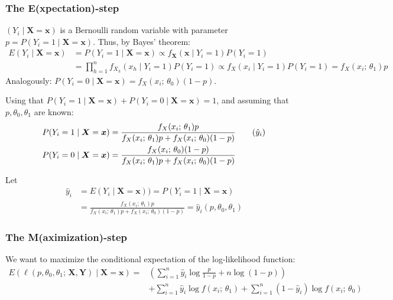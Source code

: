 \subsubsection{The E(xpectation)-step}
$(Y_i \mid \boldsymbol{X}=\boldsymbol{x})$ is a Bernoulli random variable with parameter
$p = P(Y_i = 1 \mid \boldsymbol{X}=\boldsymbol{x})$. Thus, by Bayes' theorem:
\begin{align*}
	E(Y_i \mid \boldsymbol{X}=\boldsymbol{x}) & = P(Y_i = 1 \mid \boldsymbol{X}=\boldsymbol{x})
	\propto f_{\boldsymbol{X}}(\boldsymbol{x} \mid Y_i = 1) P(Y_i = 1)                               \\
	                                          & = \prod_{h=1}^n f_{X_h}(x_h \mid Y_i = 1) P(Y_i = 1)
	\propto f_X(x_i \mid Y_i = 1) P(Y_i = 1) = f_X(x_i;\,\theta_1) p
\end{align*}
Analogously: $P(Y_i = 0 \mid \boldsymbol{X}=\boldsymbol{x}) = f_X(x_i;\,\theta_0) (1-p)$.

Using that $P(Y_i = 1 \mid \boldsymbol{X}=\boldsymbol{x}) + P(Y_i = 0 \mid \boldsymbol{X}=\boldsymbol{x}) = 1$,
and assuming that $p, \theta_0, \theta_1$ are known:
\begin{align*}
	P(Y_i = 1 \mid \boldsymbol{X}=\boldsymbol{x}) & = \frac{f_X(x_i;\,\theta_1) p}{f_X(x_i;\,\theta_1) p + f_X(x_i;\,\theta_0) (1-p)} \tag{$\hat{y}_i$} \\
	P(Y_i = 0 \mid \boldsymbol{X}=\boldsymbol{x}) & = \frac{f_X(x_i;\,\theta_0) (1-p)}{f_X(x_i;\,\theta_1) p + f_X(x_i;\,\theta_0) (1-p)}
\end{align*}

Let
\begin{align*}
	\hat{y}_i & = E(Y_i \mid \boldsymbol{X}=\boldsymbol{x}) ) =
	P(Y_i = 1 \mid \boldsymbol{X}=\boldsymbol{x})                                                 \\
	          & = \frac{f_X(x_i;\,\theta_1) p}{f_X(x_i;\,\theta_1) p + f_X(x_i;\,\theta_0) (1-p)}
	= \hat{y}_i(p,\theta_0,\theta_1)
\end{align*}

\subsubsection{The M(aximization)-step}
We want to maximize the conditional expectation of the log-likelihood function:
\begin{align*}
	E \left(\ell(p,\theta_0,\theta_1;\,\boldsymbol{X},\boldsymbol{Y}) \mid \boldsymbol{X}=\boldsymbol{x} \right)
	= & \left(
	\sum_{i=1}^n \hat{y}_i \log \frac{p}{1-p} + n \log (1 - p)
	\right)                                                                                                   \\
	  & + \sum_{i=1}^n \hat{y}_i \log f(x_i;\,\theta_1) + \sum_{i=1}^n (1 - \hat{y}_i) \log f(x_i;\,\theta_0)
\end{align*}


